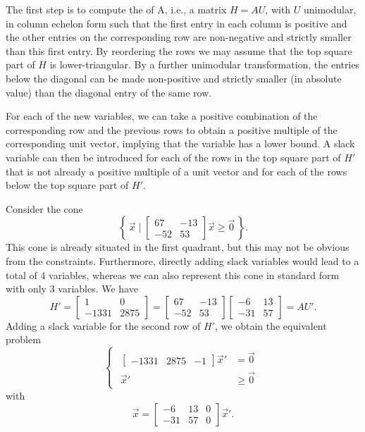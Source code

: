 The first step is to compute the  of A,
i.e., a matrix $H = A U$, with $U$ unimodular,
in column echelon form such that the
first entry in each column is positive and the other entries
on the corresponding row are non-negative and strictly smaller
than this first entry.
By reordering the rows we may assume that the top square part
of $H$ is lower-triangular.
By a further unimodular transformation, the entries
below the diagonal can be made non-positive and strictly
smaller (in absolute value) than the diagonal entry of the same row.

For each of the new variables, we can take a positive
combination of the corresponding row and the previous rows
to obtain a positive multiple of the corresponding unit vector,
implying that the variable has a lower bound.
A slack variable can then be introduced for each of the
rows in the top square part of $H'$ that is not already
a positive multiple of a unit vector and for each of
the rows below the top square part of $H'$.

\begin{example}
Consider the cone
$$
\left\{\,
\vec x \mid
\begin{bmatrix}
67 & -13 \\
-52 & 53
\end{bmatrix}
\vec x
\ge
\vec 0
\,\right\}
.
$$
This cone is already situated in the first quadrant,
but this may not be obvious from the constraints.
Furthermore, directly adding slack variables would
lead to a total of 4 variables, whereas we can also
represent this cone in standard form with only 3 variables.
We have
$$
H' =
\begin{bmatrix}
1 & 0 \\
-1331 & 2875
\end{bmatrix}
=
\begin{bmatrix}
67 & -13 \\
-52 & 53
\end{bmatrix}
\begin{bmatrix}
-6 & 13 \\
-31 & 57
\end{bmatrix}
= A U'
.
$$
Adding a slack variable for the second row of $H'$, we
obtain the equivalent problem
$$
\begin{cases}
\begin{aligned}
\begin{bmatrix}
-1331 & 2875 & -1
\end{bmatrix}
\vec x'
& =
\vec 0
\\
\vec x' & \ge \vec 0
\end{aligned}
\end{cases}
$$
with
$$
\vec x =
\begin{bmatrix}
-6 & 13 & 0 \\
-31 & 57 & 0
\end{bmatrix}
\vec x'
.
$$
\end{example}

